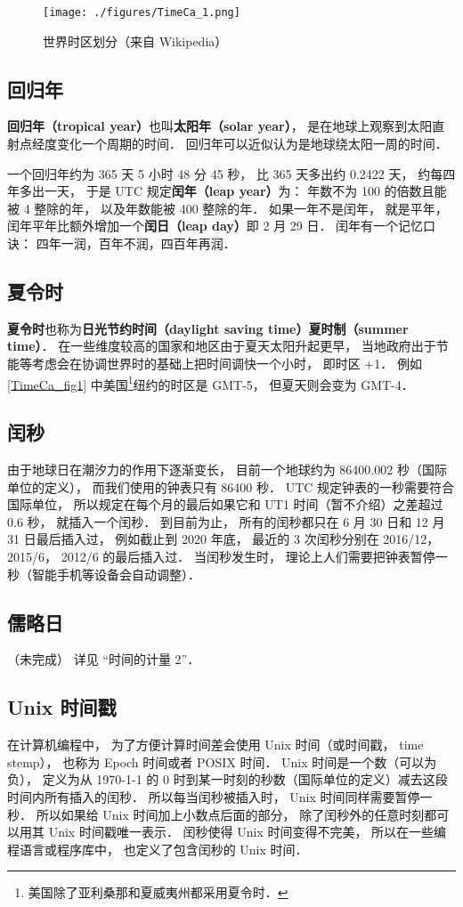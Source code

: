 \begin{figure}[ht]
\centering
\texttt{[image: ./figures/TimeCa\_1.png]}
\caption{世界时区划分（来自 Wikipedia）} \label{TimeCa_fig1}
\end{figure}

\subsection{回归年}
\textbf{回归年（tropical year）}也叫\textbf{太阳年（solar year）}， 是在地球上观察到太阳直射点经度变化一个周期的时间． 回归年可以近似认为是地球绕太阳一周的时间．

一个回归年约为 365 天 5 小时 48 分 45 秒， 比 365 天多出约 0.2422 天， 约每四年多出一天， 于是 UTC 规定\textbf{闰年（leap year）}为： 年数不为 100 的倍数且能被 4 整除的年， 以及年数能被 400 整除的年． 如果一年不是闰年， 就是平年， 闰年平年比额外增加一个\textbf{闰日（leap day）}即 2 月 29 日． 闰年有一个记忆口诀： 四年一润，百年不润，四百年再润．

\subsection{夏令时}
\textbf{夏令时}也称为\textbf{日光节约时间（daylight saving time）}\textbf{夏时制（summer time）}． 在一些维度较高的国家和地区由于夏天太阳升起更早， 当地政府出于节能等考虑会在协调世界时的基础上把时间调快一个小时， 即时区 +1． 例如\autoref{TimeCa_fig1} 中美国\footnote{美国除了亚利桑那和夏威夷州都采用夏令时．}纽约的时区是 GMT-5， 但夏天则会变为 GMT-4．

\subsection{闰秒}
由于地球日在潮汐力的作用下逐渐变长， 目前一个地球约为 86400.002 秒（国际单位的定义）， 而我们使用的钟表只有 86400 秒． UTC 规定钟表的一秒需要符合国际单位， 所以规定在每个月的最后如果它和 UT1 时间（暂不介绍）之差超过 0.6 秒， 就插入一个闰秒． 到目前为止， 所有的闰秒都只在 6 月 30 日和 12 月 31 日最后插入过， 例如截止到 2020 年底， 最近的 3 次闰秒分别在 2016/12， 2015/6， 2012/6 的最后插入过． 当闰秒发生时， 理论上人们需要把钟表暂停一秒（智能手机等设备会自动调整）．

\subsection{儒略日}
（未完成） 详见 “时间的计量 2”．

\subsection{Unix 时间戳}
在计算机编程中， 为了方便计算时间差会使用 Unix 时间（或时间戳， time stemp）， 也称为 Epoch 时间或者 POSIX 时间． Unix 时间是一个数（可以为负）， 定义为从 1970-1-1 的 0 时到某一时刻的秒数（国际单位的定义）减去这段时间内所有插入的闰秒． 所以每当闰秒被插入时， Unix 时间同样需要暂停一秒． 所以如果给 Unix 时间加上小数点后面的部分， 除了闰秒外的任意时刻都可以用其 Unix 时间戳唯一表示． 闰秒使得 Unix 时间变得不完美， 所以在一些编程语言或程序库中， 也定义了包含闰秒的 Unix 时间．
